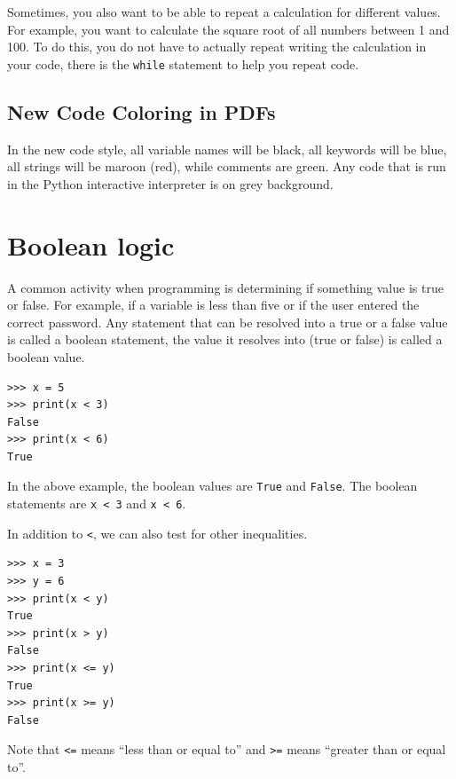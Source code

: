 \documentclass[11pt,hidelinks]{article}
\begin{document}
Sometimes, you also want to be able to repeat a calculation for different
values. For example, you want to calculate the square root of all numbers
between 1 and 100. To do this, you do not have to actually repeat writing the
calculation in your code, there is the \lstinline!while! statement to help you
repeat code.

\subsection{New Code Coloring in PDFs}
In the new code style, all variable names will be black, all keywords will be
blue, all strings will be maroon (red), while comments are green. Any code that
is run in the Python interactive interpreter is on grey background.


\pagebreak
\section{Boolean logic}
A common activity when programming is determining if something value is true or
false. For example, if a variable is less than five or if the user entered the
correct password. Any statement that can be resolved into a true or a false
value is called a boolean statement, the value it resolves into (true or false)
is called a boolean value.

\begin{lstlisting}[style=ipython]
>>> x = 5
>>> print(x < 3)
False
>>> print(x < 6)
True
\end{lstlisting}

In the above example, the boolean values are \lstinline{True} and
\lstinline{False}. The boolean statements are \lstinline{x < 3} and 
\lstinline{x < 6}. 

In addition to \lstinline{<}, we can also test for other
inequalities.
\begin{lstlisting}[style=ipython]
>>> x = 3
>>> y = 6
>>> print(x < y)
True
>>> print(x > y)
False
>>> print(x <= y)
True
>>> print(x >= y)
False
\end{lstlisting}

Note that \lstinline{<=} means ``less than or equal to'' and \lstinline{>=}
means ``greater than or equal to''. 
\end{document}
